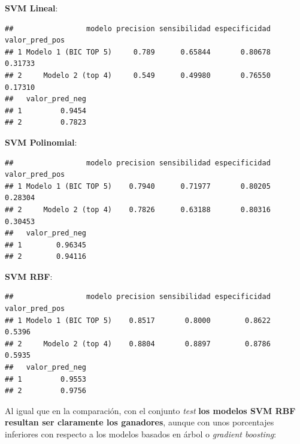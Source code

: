 \documentclass[
]{article}
\begin{document}
\textbf{SVM Lineal}:

\begin{verbatim}
##                 modelo precision sensibilidad especificidad valor_pred_pos
## 1 Modelo 1 (BIC TOP 5)     0.789      0.65844       0.80678        0.31733
## 2     Modelo 2 (top 4)     0.549      0.49980       0.76550        0.17310
##   valor_pred_neg
## 1         0.9454
## 2         0.7823
\end{verbatim}

\textbf{SVM Polinomial}:

\begin{verbatim}
##                 modelo precision sensibilidad especificidad valor_pred_pos
## 1 Modelo 1 (BIC TOP 5)    0.7940      0.71977       0.80205        0.28304
## 2     Modelo 2 (top 4)    0.7826      0.63188       0.80316        0.30453
##   valor_pred_neg
## 1        0.96345
## 2        0.94116
\end{verbatim}

\textbf{SVM RBF}:

\begin{verbatim}
##                 modelo precision sensibilidad especificidad valor_pred_pos
## 1 Modelo 1 (BIC TOP 5)    0.8517       0.8000        0.8622         0.5396
## 2     Modelo 2 (top 4)    0.8804       0.8897        0.8786         0.5935
##   valor_pred_neg
## 1         0.9553
## 2         0.9756
\end{verbatim}

Al igual que en la comparación, con el conjunto \emph{test} \textbf{los
modelos SVM RBF resultan ser claramente los ganadores}, aunque con unos
porcentajes inferiores con respecto a los modelos basados en árbol o
\emph{gradient boosting}:
\end{document}
